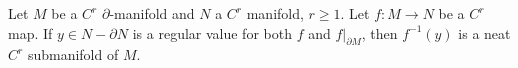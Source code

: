 Let $M$ be a $C^r$ $\partial$-manifold and $N$ a $C^r$ manifold, $r \geqslant 1$. Let $f: M \to N$ be a $C^r$ map. If $y \in N - \partial N$ is a regular value for both $f$ and $f|_{\partial M}$, then $f^{-1}(y)$ is a neat $C^r$ submanifold of $M$.
